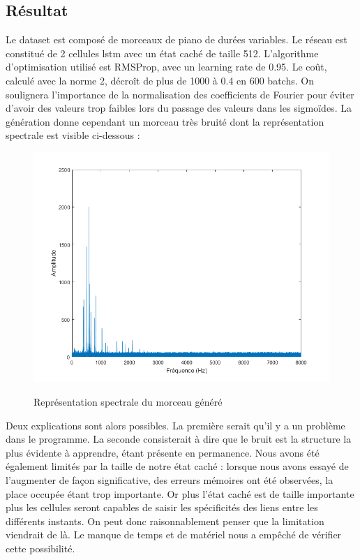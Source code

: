 \subsection{Résultat}

Le dataset est composé de morceaux de piano de durées variables. Le réseau est constitué de 2 cellules lstm avec un état caché de taille 512. L'algorithme d'optimisation utilisé est RMSProp, avec un learning rate de 0.95. Le coût, calculé avec la norme 2, décroît de plus de 1000 à 0.4 en 600 batchs. On soulignera l'importance de la normalisation des coefficients de Fourier pour éviter d'avoir des valeurs trop faibles lors du passage des valeurs dans les sigmoïdes.
La génération donne cependant un morceau très bruité dont la représentation spectrale est visible ci-dessous :

\begin{figure}[!h]
\begin{center}
	{\includegraphics[scale=0.4]{images/chapter9/spectre.png}\label{spectre}}
  \caption{Représentation spectrale du morceau généré}
\end{center}
\end{figure}

Deux explications sont alors possibles. La première serait qu'il y a un problème dans le programme. La seconde consisterait à dire que le bruit est la structure la plus évidente à apprendre, étant présente en permanence. Nous avons été également limités par la taille de notre état caché : lorsque nous avons essayé de l'augmenter de façon significative, des erreurs mémoires ont été observées, la place occupée étant trop importante. Or plus l'état caché est de taille importante plus les cellules seront capables de saisir les spécificités des liens entre les différents instants. On peut donc raisonnablement penser que la limitation viendrait de là. Le manque de temps et de matériel nous a empêché de vérifier cette possibilité.


